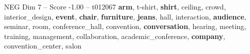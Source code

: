 \begin{textsample}{NEG Dim 7 – Score -1.00 – t012067}  \label{ex:f7_neg_037}
\textbf{arm}, t-shirt, \textbf{shirt}, ceiling, crowd, interior\_design, \textbf{event}, \textbf{chair}, \textbf{furniture}, \textbf{jeans}, hall, interaction, \textbf{audience}, seminar, room, conference\_hall, convention, \textbf{conversation}, hearing, meeting, training, management, collaboration, academic\_conference, \textbf{company}, convention\_center, salon

\end{textsample}
